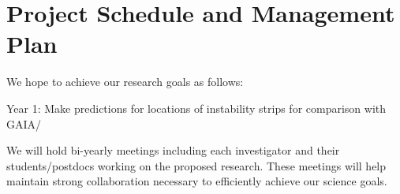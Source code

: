 \section{Project Schedule and Management Plan}

We hope to achieve our research goals as follows:

Year 1: Make predictions for locations of instability strips for comparison with GAIA/ 

We will  hold bi-yearly meetings including each investigator and their students/postdocs working on the proposed research. These meetings will help maintain strong collaboration necessary to efficiently achieve our science goals.
